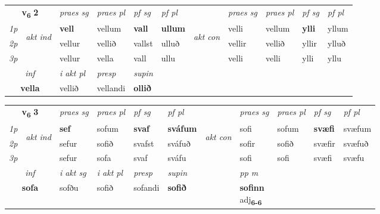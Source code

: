 \noindent
\begin{tabular}{lllllllllll} \toprule
\multicolumn{2}{c}{\textbf{v{\textsubscript{6}}} \Large{\textbf{2}}}  &  \textit{praes sg}  & \textit{praes pl}  &\textit{ pf sg} & \textit{pf pl} &  &  \textit{praes sg}  & \textit{praes pl}  & \textit{pf sg} & \textit{pf pl } \\*
	\cmidrule{3-6} \cmidrule{8-11}
 {\textit{1p}} & \multirow{3}{*}{\begin{turn}{90}\textit{akt ind}\end{turn}} & \textbf{vell} & vellum & \textbf{vall} & \textbf{ullum} & \multirow{3}{*}{\begin{turn}{90}\textit{akt con}\end{turn}} &velli & vellum & \textbf{ylli} & yllum\\*
 {\textit{2p}} &  &  vellur  & vellið & vallst & ulluð & & vellir & vellið & yllir & ylluð \\*
{\textit{3p}} &  & vellur & vella & vall & ullu & & velli & velli& ylli & yllu \\*
\cmidrule{3-6} \cmidrule{8-11}

   \multicolumn{2}{c}{\textit{inf}}  & \textit{i akt pl}   & \textit{presp} & \textit{supin}   \\*
  \multicolumn{2}{c}{\textbf{vella}}   & vellið   & vellandi &  \textbf{ollið}   \\*
\end{tabular}

\noindent
\begin{tabular}{lllllllllll} \toprule
\multicolumn{2}{c}{\textbf{v{\textsubscript{6}}} \Large{\textbf{3}}}  &  \textit{praes sg}  & \textit{praes pl}  &\textit{ pf sg} & \textit{pf pl} &  &  \textit{praes sg}  & \textit{praes pl}  & \textit{pf sg} & \textit{pf pl } \\*
	\cmidrule{3-6} \cmidrule{8-11}
 {\textit{1p}} & \multirow{3}{*}{\begin{turn}{90}\textit{akt ind}\end{turn}} & \textbf{sef} & sofum & \textbf{svaf} & \textbf{sváfum} & \multirow{3}{*}{\begin{turn}{90}\textit{akt con}\end{turn}} &sofi & sofum & \textbf{svæfi} & svæfum\\*
 {\textit{2p}} &  &  sefur  & sofið & svafst & sváfuð & & sofir & sofið & svæfir & svæfuð \\*
{\textit{3p}} &  & sefur & sofa & svaf & sváfu & & sofi & sofi& svæfi & svæfu \\*
\cmidrule{3-6} \cmidrule{8-11}

   \multicolumn{2}{c}{\textit{inf}}  & \textit{i akt sg} & \textit{i akt pl}   & \textit{presp} & \textit{supin}  && \textit{pp m} \\*
  \multicolumn{2}{c}{\textbf{sofa}} & sofðu  & sofið   & sofandi &  \textbf{sofið}  && \specialcell{\textbf{sofinn} \\ adj\textbf{\textsubscript{6-6}}} \\*
\end{tabular}

